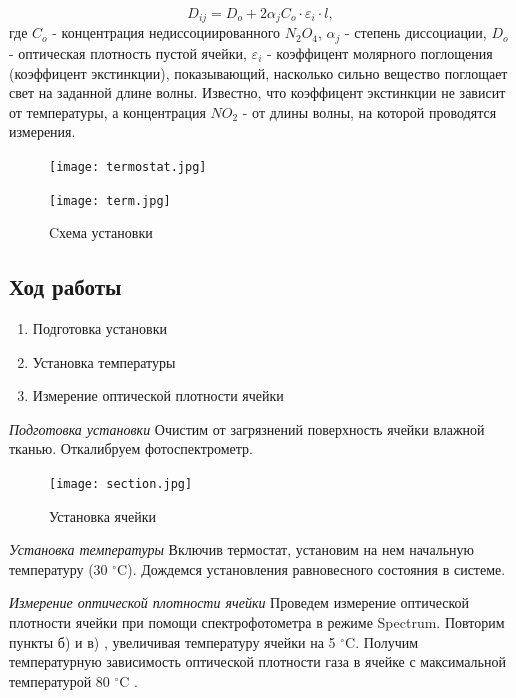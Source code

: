 \documentclass[a4paper,12pt]{article} %
\begin{document}
\begin{equation}
 D_{ij} =D_o + 2\alpha_jC_o \cdot \varepsilon_i \cdot l,
\end{equation}
где $C_o$ - концентрация недиссоциированного $N_2 O_4$, $\alpha_j$ - степень диссоциации, $D_o$ - оптическая плотность пустой ячейки, $\varepsilon_i$ -  коэффицент молярного поглощения (коэффицент экстинкции), показывающий, насколько сильно вещество поглощает свет на заданной длине волны. Известно, что коэффицент экстинкции не зависит от температуры, а концентрация $NO_2$ - от длины волны, на которой проводятся измерения. 

\begin{figure}[h]
	\begin{center}
		\begin{minipage}{0.45 \linewidth}
			\texttt{[image: termostat.jpg]}
		\end{minipage}
		\qquad
		\begin{minipage}{0.45 \linewidth}
			\texttt{[image: term.jpg]}
		\end{minipage}
	\end{center}
	\caption{Cхема установки}
\end{figure}

\subsection*{Ход работы}
\begin{enumerate}
	\item Подготовка установки
	\item Установка температуры
	\item Измерение оптической плотности ячейки
\end{enumerate}


\emph{Подготовка установки}
Очистим от загрязнений поверхность ячейки влажной тканью. Откалибруем фотоспектрометр.


\begin{figure}
	
		\begin{center}
			\texttt{[image: section.jpg]}
		\end{center}
	
	\caption{Установка ячейки}
\end{figure}

\emph{Установка температуры}
Включив термостат, установим на нем начальную температуру (30 $^\circ$C). Дождемся установления равновесного состояния в системе.

\emph{Измерение оптической плотности ячейки}
Проведем измерение оптической плотности ячейки при помощи спектрофотометра в режиме Spectrum. Повторим пункты б) и в) , увеличивая температуру ячейки на 5 $^\circ$C. Получим температурную зависимость оптической плотности газа в ячейке с максимальной температурой 80 $^\circ $C .
\end{document}
